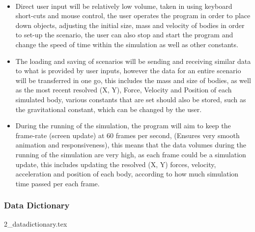 \paragraph{}
\begin{itemize}
\item Direct user input will be relatively low volume, taken in using keyboard short-cuts and mouse control, the user operates the program in order to place down objects, adjusting the initial size, mass and velocity of bodies in order to set-up the scenario, the user can also stop and start the program and change the speed of time within the simulation as well as other constants.
\item The loading and saving of scenarios will be sending and receiving similar data to what is provided by user inputs, however the data for an entire scenario will be transferred in one go, this includes the mass and size of bodies, as well as the most recent resolved (X, Y), Force, Velocity and Position of each simulated body, various constants that are set should also be stored, such as the gravitational constant, which can be changed by the user.
\item During the running of the simulation, the program will aim to keep the frame-rate (screen update) at 60 frames per second, (Ensures very smooth animation and responsiveness), this means that the data volumes during the running of the simulation are very high, as each frame could be a simulation update, this includes updating the resolved (X, Y) forces, velocity, acceleration and position of each body, according to how much simulation time passed per each frame.
\end{itemize}

\pagebreak

\subsubsection{Data Dictionary}
{2_datadictionary.tex}
